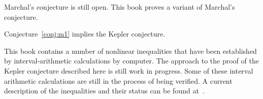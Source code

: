 Marchal's conjecture is still open.  This book proves a variant of Marchal's conjecture.

\begin{theorem}\label{theorem:mk1}
Conjecture~\ref{conj:m1} implies the Kepler conjecture.
\end{theorem}

\begin{note}%
This book contains a number of nonlinear inequalities that have been established by interval-arithmetic calculations by computer.  The approach to the proof of the Kepler conjecture described here is still work in progress.  Some of these interval arithmetic calculations are still in the process of being verified.  A current description of the inequalities and their status can be found at~\cite{hales:2009:nonlinear}.
\end{note}

